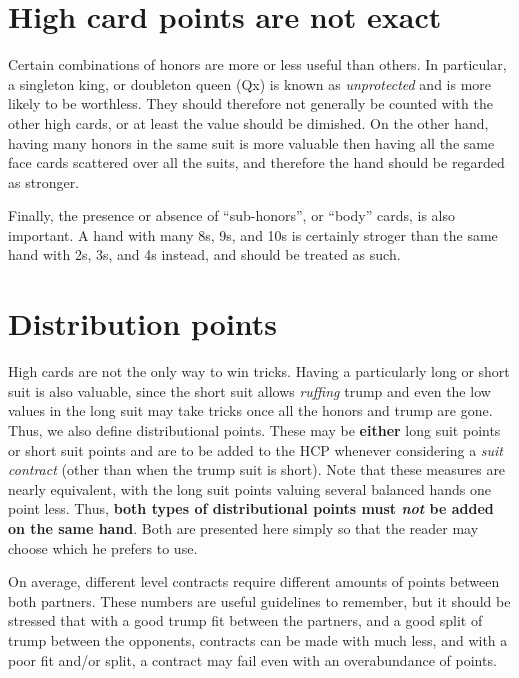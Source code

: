 \documentclass[oneside]{memoir}
\begin{document}
\section{High card points are not exact}
Certain combinations of honors are more or less useful than others.
In particular, a singleton king, or doubleton queen (Qx) is known as
\textit{unprotected} and is more likely to be worthless.  They should
therefore not generally be counted with the other high cards, or at least
the value should be dimished.  On the other hand, having many honors in
the same suit is more valuable then having all the same face cards scattered
over all the suits, and therefore the hand should be regarded as stronger.

Finally, the presence or absence of ``sub-honors'', or ``body'' cards, is
also important.  A hand with many 8s, 9s, and 10s is certainly stroger
than the same hand with 2s, 3s, and 4s instead, and should be treated as such.

\section{Distribution points}
High cards are not the only way to win tricks.  Having a particularly long
or short suit is also valuable, since the short suit allows \textit{ruffing}
trump and even the low values in the long suit may take tricks once all the
honors and trump are gone.  Thus, we also define distributional points.
These may be \textbf{either} long suit points or short suit points and are
to be added to the HCP whenever considering a \textit{suit contract} (other
than when the trump suit is short).
Note that these measures are nearly equivalent, with the long suit points
valuing several balanced hands one point less.  Thus, \textbf{both types
of distributional points must \emph{not} be added on the same hand}.  Both are
presented here simply so that the reader may choose which he prefers to use.

On average, different level contracts require different amounts of points
between both partners.  These numbers are useful guidelines to remember,
but it should be stressed that with a good trump fit between the partners,
and a good split of trump between the opponents, contracts
can be made with much less, and with a poor fit and/or split,
a contract may fail even with an overabundance of points.
\traceon
{}
\end{document}
